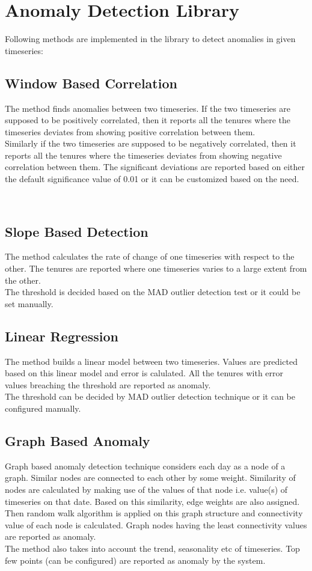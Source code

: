 \section{Anomaly Detection Library}
Following methods are implemented in the library to detect anomalies in given timeseries:
\\

\subsection{Window Based Correlation}
The method finds anomalies between two timeseries. If the two timeseries are supposed to be positively correlated, then it reports all the tenures where the timeseries deviates from showing positive correlation between them.
\\
Similarly if the two timeseries are supposed to be negatively correlated, then it reports all the tenures where the timeseries deviates from showing negative correlation between them. The significant deviations are reported based on either the default significance value of 0.01 or it can be customized based on the need.

\
\subsection{Slope Based Detection}
The  method calculates the rate of change of one timeseries with respect to the other. The tenures are reported where one timeseries varies to a large extent from the other.
\\
The threshold is decided based on the MAD outlier detection test or it could be set manually.
\subsection{Linear Regression}
The method builds a linear model between two timeseries. Values are predicted based on this linear model and error is calulated. All the tenures with error values breaching the threshold are reported as anomaly. 
\\
The threshold can be decided by MAD outlier detection technique or it can be configured manually.
\subsection{Graph Based Anomaly}
Graph based anomaly detection technique considers each day as a node of a graph. Similar nodes are connected to each other by some weight. Similarity of nodes are calculated by making use of the values of that node i.e. value(s) of timeseries on that date. Based on this similarity, edge weights are also assigned. Then random walk algorithm is applied on this graph structure and connectivity value of each node is calculated. Graph nodes having the least connectivity values are reported as anomaly.
\\
The method also takes into account the trend, seasonality etc of timeseries. Top few points (can be configured) are reported as anomaly by the system.
